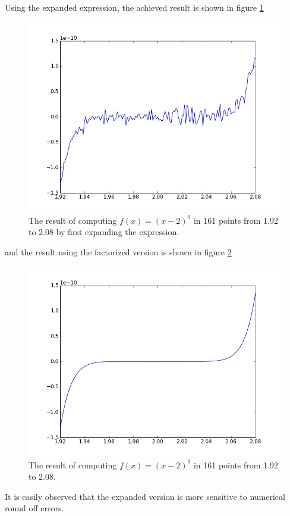 \documentclass[a4paper]{article}
\begin{document}
\begin{enumerate}
Using the expanded expression, the achieved result is shown in figure \ref{fig: t21}
\begin{figure}
\centering
\includegraphics[scale=0.3]{task2_2.jpeg}
\caption{\label{fig: t21}The result of computing $f(x)=(x-2)^9$ in 161 points from 1.92 to 2.08 by first expanding the expression.}
\end{figure} 
and the result using the factorized version is shown in figure \ref{fig: t22}
\begin{figure}
\centering
\includegraphics[scale=0.3]{task2_b_1.jpeg}
\caption{\label{fig: t22}The result of computing $f(x)=(x-2)^9$ in 161 points from 1.92 to 2.08.}
\end{figure} 
It is easily observed that the expanded version is more sensitive to numerical round off errors.


\end{enumerate}
\end{document}
